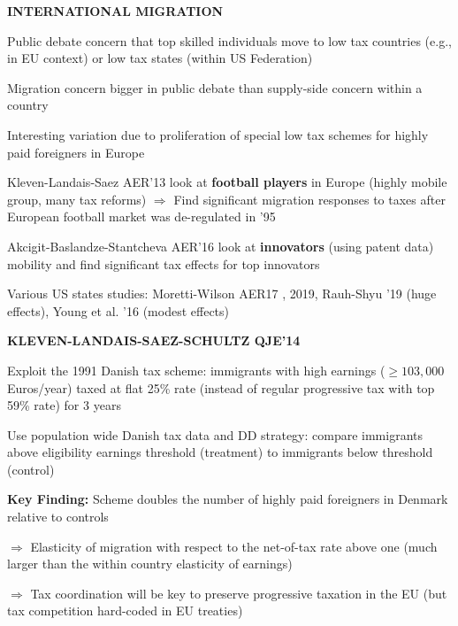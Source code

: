 \documentclass[landscape]{slides}
\begin{document}
\begin{slide}

\end{slide}


\begin{slide}
\begin{center}
{\bf INTERNATIONAL MIGRATION}
\end{center}
Public debate concern that top skilled individuals move to low tax countries (e.g., in EU context)
or low tax states (within US Federation)

Migration concern bigger in public debate than supply-side concern within a country 


Interesting variation due to proliferation of special low tax schemes for highly paid foreigners
in Europe

\small

Kleven-Landais-Saez AER'13 look at \textbf{football players} in Europe (highly mobile group, many tax
reforms) $\Rightarrow$ Find significant migration responses to taxes after European football market
was de-regulated in '95

Akcigit-Baslandze-Stantcheva AER'16 look at \textbf{innovators} (using patent data) mobility and find significant tax
effects for top innovators

\normalsize

Various US states studies: Moretti-Wilson AER17 , 2019, Rauh-Shyu '19 (huge effects), Young et al. '16 (modest effects)



\end{slide}


\begin{slide}
\begin{center}
{\bf KLEVEN-LANDAIS-SAEZ-SCHULTZ QJE'14}
\end{center}
Exploit the 1991 Danish tax scheme:  immigrants with high earnings ($ \geq 103,000$ Euros/year)
taxed at flat 25\% rate (instead of regular progressive tax with top 59\% rate) for 3 years

Use population wide Danish tax data and DD strategy: compare immigrants above eligibility
earnings threshold (treatment) to immigrants below threshold (control) 

\textbf{Key Finding:} Scheme doubles the number of highly paid
foreigners in Denmark relative to controls

$\Rightarrow$ Elasticity of migration with respect to the net-of-tax rate above one
(much larger than the within country elasticity of earnings)

$\Rightarrow$ Tax coordination will be key to
preserve progressive taxation in the EU (but tax competition hard-coded in EU treaties)

\end{slide}
\end{document}
